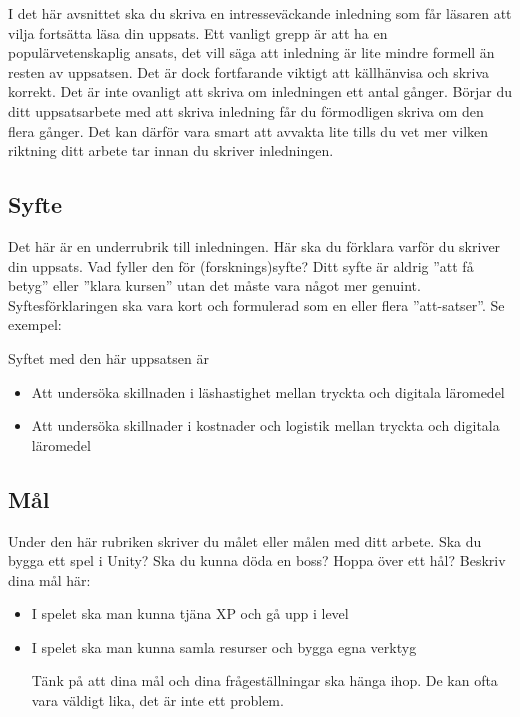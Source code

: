\documentclass[12pt]{article}
\begin{document}
I det här avsnittet ska du skriva en intresseväckande inledning som får läsaren att vilja fortsätta läsa din uppsats. Ett vanligt grepp är att ha en populärvetenskaplig ansats, det vill säga att inledning är lite mindre formell än resten av uppsatsen. Det är dock fortfarande viktigt att källhänvisa och skriva korrekt. 
Det är inte ovanligt att skriva om inledningen ett antal gånger. Börjar du ditt uppsatsarbete med att skriva inledning får du förmodligen skriva om den flera gånger. Det kan därför vara smart att avvakta lite tills du vet mer vilken riktning ditt arbete tar innan du skriver inledningen.


\subsection{Syfte}

Det här är en underrubrik till inledningen. Här ska du förklara varför du skriver din uppsats. Vad fyller den för (forsknings)syfte? Ditt syfte är aldrig ”att få betyg” eller ”klara kursen” utan det måste vara något mer genuint. Syftesförklaringen ska vara kort och formulerad som en eller flera ”att-satser”. Se exempel: 

Syftet med den här uppsatsen är

\begin{itemize}
    \item Att undersöka skillnaden i läshastighet mellan tryckta och digitala läromedel
    \item Att undersöka skillnader i kostnader och logistik mellan tryckta och digitala läromedel
\end{itemize}

\subsection{Mål}

Under den här rubriken skriver du målet eller målen med ditt arbete. Ska du bygga ett spel i Unity? Ska du kunna döda en boss? Hoppa över ett hål? Beskriv dina mål här: 

\begin{itemize}
    \item I spelet ska man kunna tjäna XP och gå upp i level
    \item I spelet ska man kunna samla resurser och bygga egna verktyg

Tänk på att dina mål och dina frågeställningar ska hänga ihop. De kan ofta vara väldigt lika, det är inte ett problem. 

\end{itemize}
\end{document}
